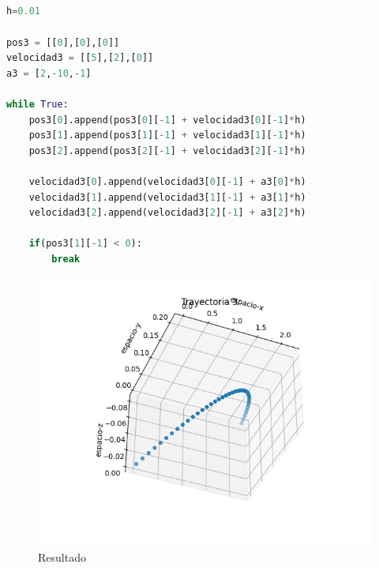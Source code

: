 \documentclass{article}
\begin{document}
\subsection{}
\begin{lstlisting}[language=Python,caption=Desafío 1.3]
h=0.01

pos3 = [[0],[0],[0]]
velocidad3 = [[5],[2],[0]]
a3 = [2,-10,-1]

while True:
    pos3[0].append(pos3[0][-1] + velocidad3[0][-1]*h)
    pos3[1].append(pos3[1][-1] + velocidad3[1][-1]*h)
    pos3[2].append(pos3[2][-1] + velocidad3[2][-1]*h)

    velocidad3[0].append(velocidad3[0][-1] + a3[0]*h)
    velocidad3[1].append(velocidad3[1][-1] + a3[1]*h)
    velocidad3[2].append(velocidad3[2][-1] + a3[2]*h)

    if(pos3[1][-1] < 0):
        break
\end{lstlisting}
\begin{figure}[H]
    \centering
    \includegraphics[width=1.21\textwidth]{desa3.png}
    \caption{Resultado}
\end{figure}
\subsection{}
\end{document}

